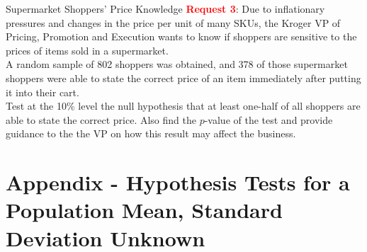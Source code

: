\documentclass[pdf]{beamer}
\theoremstyle{remark}
\theoremstyle{definition}
\begin{document}
\begin{frame}[t]{Supermarket Shoppers’ Price Knowledge}
\textcolor{red}{\textbf{Request 3}}: Due to inflationary pressures and changes in the price per unit of many SKUs,  the Kroger VP of Pricing, Promotion and Execution wants to know if shoppers are sensitive to the prices of items sold in a supermarket. \\
\vspace{1.5ex}
A random sample of 802 shoppers was obtained, and 378 of those supermarket shoppers were able to state the correct price of an item immediately after putting it into their cart. \\
\vspace{1.5ex}
Test at the 10\% level the null hypothesis that at least one-half of all shoppers are able to state the correct price.  Also find the $p$-value of the test and provide guidance to the the VP on how this result may affect the business. 
\end{frame}

\section{Appendix - Hypothesis Tests for a Population Mean, Standard Deviation Unknown}
\end{document}
